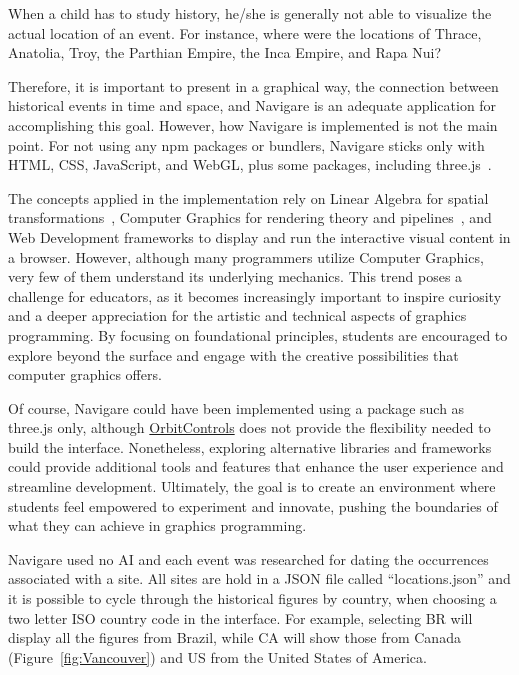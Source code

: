 \documentclass[onecolumn,3p]{elsarticle}
\begin{document}
When a child has to study history, he/she is generally not able to visualize the actual location of an event.
For instance, where were the locations of Thrace, Anatolia, Troy, the Parthian Empire, the Inca Empire, and Rapa Nui?

Therefore, it is important to present in a graphical way, the connection between historical events in time and space,
and Navigare is an adequate application for accomplishing this goal.
However, how Navigare is implemented is not the main point. For not using any npm packages or bundlers,
Navigare sticks only with HTML, CSS, JavaScript, and WebGL, plus some packages, including three.js~\cite{three.js}.

The concepts applied in the implementation rely on Linear Algebra for spatial transformations~\cite{Hefferon2021},
Computer Graphics for rendering theory and pipelines~\cite{eck2023introduction},
and Web Development frameworks to display and run the interactive visual content in a browser.
However, although many programmers utilize Computer Graphics, very few of them understand its underlying mechanics.
This trend poses a challenge for educators, as it becomes increasingly important to inspire curiosity and a
deeper appreciation for the artistic and technical aspects of graphics programming.
By focusing on foundational principles, students are encouraged to explore beyond the surface and engage with
the creative possibilities that computer graphics offers.

Of course, Navigare could have been implemented using a package such as three.js only,
although \href{https://threejs.org/docs/#OrbitControls}{OrbitControls} does not provide the flexibility needed to build the interface.
Nonetheless, exploring alternative libraries and frameworks could provide additional tools and features
that enhance the user experience and streamline development.
Ultimately, the goal is to create an environment where students feel empowered to experiment and innovate,
pushing the boundaries of what they can achieve in graphics programming.

Navigare used no AI and each event was researched for dating the occurrences associated with a site.
All sites are hold in a JSON file called ``locations.json'' and it is possible to cycle through the historical figures by country,
when choosing a two letter ISO country code in the interface.
For example, selecting BR will display all the figures from Brazil,
while CA will show those from Canada (Figure~\ref{fig:Vancouver}) and US from the United States of America.
\end{document}
